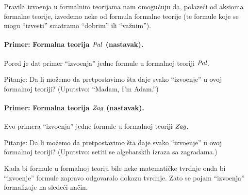 \bigskip

Pravila izvo\dj enja u formalnim teorijama nam omogu\'cuju da, polaze\'ci od aksioma formalne teorije, izvedemo neke
od formula formalne teorije (te formule koje se mogu ``izvesti''
smatramo ``dobrim'' ili ``va\v znim'').


\bigskip

\begin{explanationpic}
  \paragraph{Primer: Formalna teorija $\mathit{Pal}$ (nastavak).} Pored je dat primer ``izvo\dj enja'' jedne formule u formalnoj
  teoriji $\mathit{Pal}$.
  
  Pitanje: Da li mo\v zemo da pretpostavimo \v sta daje svako ``izvo\dj enje'' u ovoj formalnoj teoriji?
  (Uputstvo: ``Madam, I'm Adam.'')
\sidepic
  \ \\
  
\end{explanationpic}

\paragraph{Primer: Formalna teorija $\mathit{Zag}$ (nastavak).} Evo primera ``izvo\dj enja'' jedne formule u formalnoj
  teoriji $\mathit{Zag}$.

\begin{center}
  
\end{center}

  Pitanje: Da li mo\v zemo da pretpostavimo \v sta daje svako ``izvo\dj enje'' u ovoj formalnoj teoriji?
  (Uputstvo: setiti se algebarskih izraza sa zagradama.)


\bigskip

Kada bi formule u formalnoj teoriji bile neke matemati\v cke tvrdnje onda bi
``izvo\dj enje'' formule zapravo odgovaralo dokazu tvrdnje. Zato se pojam ``izvo\dj enja''
formalizuje na slede\'ci na\v cin.

